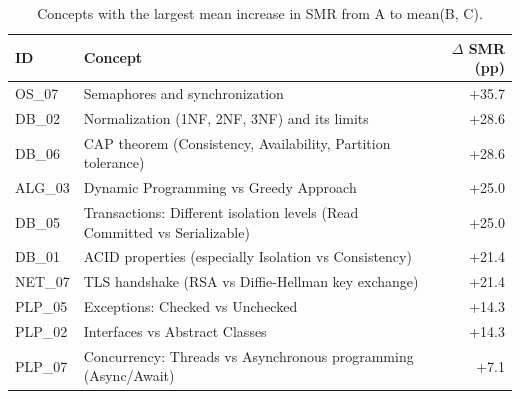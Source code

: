 \begin{table}[H]
\caption{Concepts with the largest mean increase in SMR from A to mean(B, C).}
\label{tab:concepts:top10}
\centering
\begin{tabular}{llr}
\toprule
ID & Concept & $\Delta$ SMR (pp) \\
\midrule
OS_07 & Semaphores and synchronization & +35.7 \\
DB_02 & Normalization (1NF, 2NF, 3NF) and its limits & +28.6 \\
DB_06 & CAP theorem (Consistency, Availability, Partition tolerance) & +28.6 \\
ALG_03 & Dynamic Programming vs Greedy Approach & +25.0 \\
DB_05 & Transactions: Different isolation levels (Read Committed vs Serializable) & +25.0 \\
DB_01 & ACID properties (especially Isolation vs Consistency) & +21.4 \\
NET_07 & TLS handshake (RSA vs Diffie-Hellman key exchange) & +21.4 \\
PLP_05 & Exceptions: Checked vs Unchecked & +14.3 \\
PLP_02 & Interfaces vs Abstract Classes & +14.3 \\
PLP_07 & Concurrency: Threads vs Asynchronous programming (Async/Await) & +7.1 \\
\bottomrule
\end{tabular}
\end{table}
